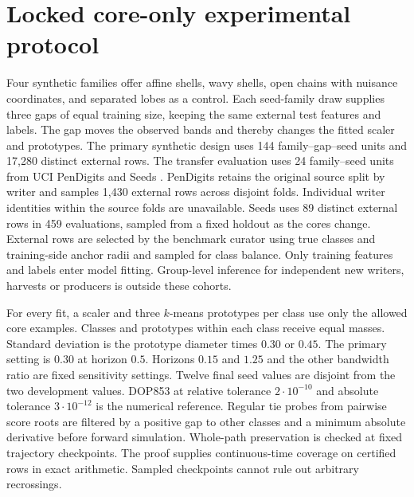 \documentclass[10pt]{article}
\begin{document}
\section{Locked core-only experimental protocol}
Four synthetic families offer affine shells, wavy shells, open chains with nuisance coordinates, and separated lobes as a control. Each seed-family draw supplies three gaps of equal training size, keeping the same external test features and labels. The gap moves the observed bands and thereby changes the fitted scaler and prototypes. The primary synthetic design uses 144 family--gap--seed units and 17,280 distinct external rows. The transfer evaluation uses 24 family--seed units from UCI PenDigits and Seeds \cite{pendigits,seeds}. PenDigits retains the original source split by writer and samples 1,430 external rows across disjoint folds. Individual writer identities within the source folds are unavailable. Seeds uses 89 distinct external rows in 459 evaluations, sampled from a fixed holdout as the cores change. External rows are selected by the benchmark curator using true classes and training-side anchor radii and sampled for class balance. Only training features and labels enter model fitting. Group-level inference for independent new writers, harvests or producers is outside these cohorts.

For every fit, a scaler and three $k$-means prototypes per class use only the allowed core examples. Classes and prototypes within each class receive equal masses. Standard deviation is the prototype diameter times $0.30$ or $0.45$. The primary setting is $0.30$ at horizon $0.5$. Horizons $0.15$ and $1.25$ and the other bandwidth ratio are fixed sensitivity settings. Twelve final seed values are disjoint from the two development values. DOP853 at relative tolerance $2\cdot10^{-10}$ and absolute tolerance $3\cdot10^{-12}$ is the numerical reference. Regular tie probes from pairwise score roots are filtered by a positive gap to other classes and a minimum absolute derivative before forward simulation. Whole-path preservation is checked at fixed trajectory checkpoints. The proof supplies continuous-time coverage on certified rows in exact arithmetic. Sampled checkpoints cannot rule out arbitrary recrossings.
\end{document}
